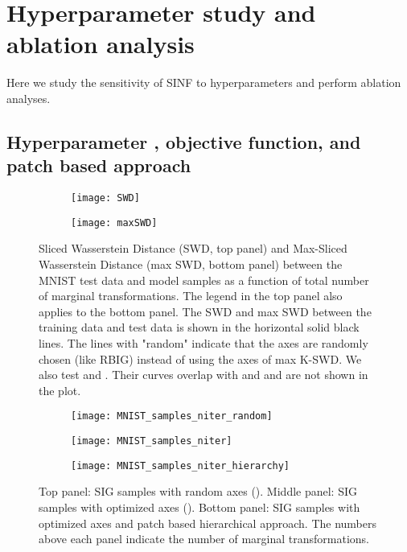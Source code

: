 \documentclass{article}
\begin{document}
\section{Hyperparameter study and ablation analysis}
\label{sec:ablation}
Here we study the sensitivity of SINF to hyperparameters and perform 
ablation analyses. 
\subsection{Hyperparameter , objective function, and patch based approach}



\begin{figure}[htb]
     \centering
     \begin{subfigure}[b]{\linewidth}
         \centering
         \texttt{[image: SWD]}
     \end{subfigure}
     \hfill
     \begin{subfigure}[b]{\linewidth}
         \centering
         \texttt{[image: maxSWD]}
     \end{subfigure}
     \caption{Sliced Wasserstein Distance (SWD, top panel) and Max-Sliced Wasserstein Distance (max SWD, bottom panel) between the MNIST test data and model samples as a function of total number of marginal transformations. The legend in the top panel also applies to the bottom panel. The SWD and max SWD between the training data and test data is shown in the horizontal solid black lines. The lines with "random" indicate that the axes are randomly chosen (like RBIG) instead of using the axes of max K-SWD. We also test  and . Their curves overlap with  and  and are not shown in the plot.}
     \label{fig:convergence}
     \vskip -0.10in
\end{figure}

\begin{figure}[htb]
     \centering
     \begin{subfigure}[b]{\linewidth}
         \centering
         \texttt{[image: MNIST\_samples\_niter\_random]}
     \end{subfigure}
     \hfill
     \begin{subfigure}[b]{\linewidth}
         \centering
         \texttt{[image: MNIST\_samples\_niter]}
     \end{subfigure}
     \begin{subfigure}[b]{\linewidth}
         \centering
         \texttt{[image: MNIST\_samples\_niter\_hierarchy]}
     \end{subfigure}
    \caption{Top panel: SIG samples with random axes (). Middle panel: SIG samples with optimized axes (). Bottom panel: SIG samples with optimized axes and patch based hierarchical approach. The numbers above each panel indicate the number of marginal transformations.}
    \label{fig:ablation}
\end{figure}
\end{document}

